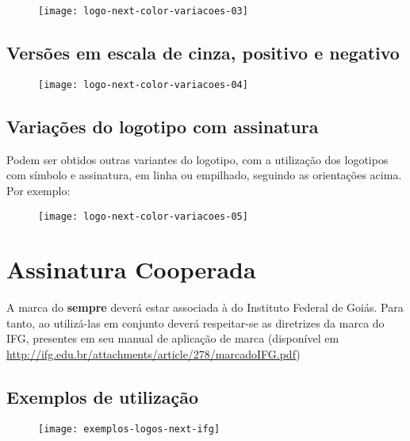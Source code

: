 \documentclass{manualmarca}
\begin{document}
\begin{figure}[!htp]
  \centering
  \texttt{[image: logo-next-color-variacoes-03]}
\end{figure}

\subsection{Versões em escala de cinza, positivo e negativo}

\begin{figure}[!htp]
  \centering
  \texttt{[image: logo-next-color-variacoes-04]}
\end{figure}

\subsection{Variações do logotipo com assinatura}

Podem ser obtidos outras variantes do logotipo, com a utilização dos logotipos com símbolo e assinatura, em linha ou empilhado, seguindo as orientações acima. Por exemplo:

\begin{figure}[!htp]
  \centering
  \texttt{[image: logo-next-color-variacoes-05]}
\end{figure}


\pagebreak[4]
\section{Assinatura Cooperada}
\label{sec:assinatura-cooperada}

A marca do \NExT{} \textbf{sempre} deverá estar associada à do Instituto Federal de Goiás. Para tanto, ao utilizá-las em conjunto deverá respeitar-se as diretrizes da marca do IFG, presentes em seu manual de aplicação de marca (disponível em \url{http://ifg.edu.br/attachments/article/278/marcadoIFG.pdf})

\subsection{Exemplos de utilização}
\label{sec:exempl-de-util}

\begin{figure}[!htp]
  \centering
  \texttt{[image: exemplos-logos-next-ifg]}
\end{figure}
\end{document}
